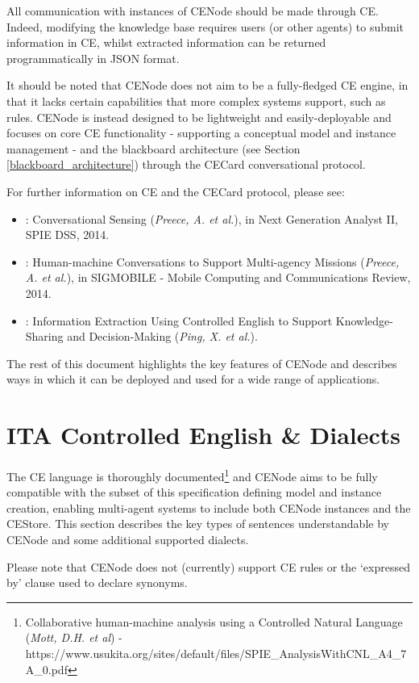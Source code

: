 \documentclass{scrartcl}
\begin{document}
All communication with instances of CENode should be made through CE. Indeed, modifying the knowledge base requires users (or other agents) to submit information in CE, whilst extracted information can be returned programmatically in JSON format.

It should be noted that CENode does not aim to be a fully-fledged CE engine, in that it lacks certain capabilities that more complex systems support, such as rules. CENode is instead designed to be lightweight and easily-deployable and focuses on core CE functionality - supporting a conceptual model and instance management - and the blackboard architecture (see Section \ref{blackboard_architecture}) through the CECard conversational protocol.

For further information on CE and the CECard protocol, please see:
\begin{itemize}
    \item \cite{preece14cs}: Conversational Sensing (\textit{Preece, A. et al.}), in Next Generation Analyst II, SPIE DSS, 2014.
    \item \cite{preece14hmc}: Human-machine Conversations to Support Multi-agency Missions (\textit{Preece, A. et al.}), in SIGMOBILE - Mobile Computing and Communications Review, 2014.
    \item \cite{ping12}: Information Extraction Using Controlled English to Support Knowledge-Sharing and Decision-Making (\textit{Ping, X. et al.}).
\end{itemize}

The rest of this document highlights the key features of CENode and describes ways in which it can be deployed and used for a wide range of applications.

\section{ITA Controlled English \& Dialects}
The CE language is thoroughly documented\footnote{Collaborative human-machine analysis using a Controlled Natural Language  (\textit{Mott, D.H. et al}) - https://www.usukita.org/sites/default/files/SPIE\_AnalysisWithCNL\_A4\_7A\_0.pdf} and CENode aims to be fully compatible with the subset of this specification defining model and instance creation, enabling multi-agent systems to include both CENode instances and the CEStore. This section describes the key types of sentences understandable by CENode and some additional supported dialects.

Please note that CENode does not (currently) support CE rules or the `expressed by' clause used to declare synonyms.
\end{document}
